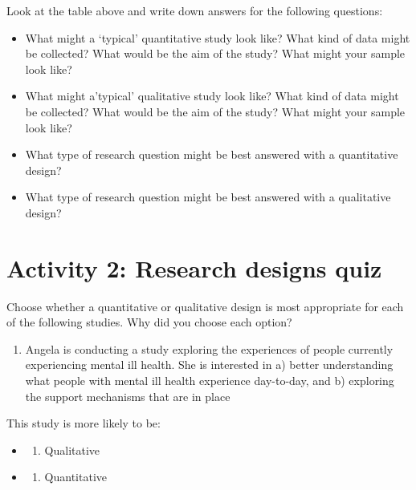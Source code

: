 \documentclass[
  english,
  letterpaper,
  DIV=11,
  numbers=noendperiod]{scrreprt}
\providecommand{\tightlist}{%
  \setlength{\itemsep}{0pt}\setlength{\parskip}{0pt}}
\begin{document}
Look at the table above and write down answers for the following
questions:

\begin{itemize}
\tightlist
\item
  What might a `typical' quantitative study look like? What kind of data
  might be collected? What would be the aim of the study? What might
  your sample look like?
\item
  What might a'typical' qualitative study look like? What kind of data
  might be collected? What would be the aim of the study? What might
  your sample look like?
\item
  What type of research question might be best answered with a
  quantitative design?
\item
  What type of research question might be best answered with a
  qualitative design?
\end{itemize}

\section{Activity 2: Research designs
quiz}\label{activity-2-research-designs-quiz}

Choose whether a quantitative or qualitative design is most appropriate
for each of the following studies. Why did you choose each option?

\begin{enumerate}
\def\labelenumi{\arabic{enumi}.}
\tightlist
\item
  Angela is conducting a study exploring the experiences of people
  currently experiencing mental ill health. She is interested in a)
  better understanding what people with mental ill health experience
  day-to-day, and b) exploring the support mechanisms that are in place
\end{enumerate}

This study is more likely to be:

\begin{itemize}
\tightlist
\item
  \begin{enumerate}
  \def\labelenumi{(\Alph{enumi})}
  \tightlist
  \item
    Qualitative\\
  \end{enumerate}
\item
  \begin{enumerate}
  \def\labelenumi{(\Alph{enumi})}
  \setcounter{enumi}{1}
  \tightlist
  \item
    Quantitative
  \end{enumerate}
\end{itemize}
\end{document}
